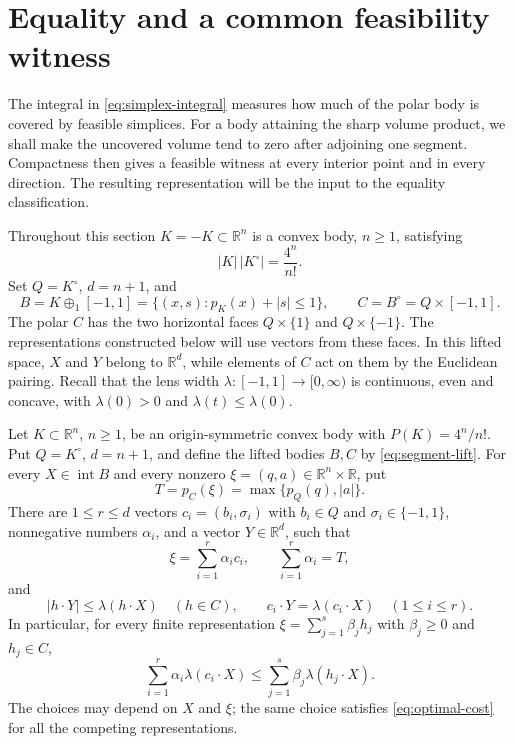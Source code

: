 \section{Equality and a common feasibility witness}
\label{sec:zero-deficit}

The integral in \eqref{eq:simplex-integral} measures how much of the
polar body is covered by feasible simplices. For a body attaining the
sharp volume product, we shall make the uncovered volume tend to zero
after adjoining one segment. Compactness then gives a feasible witness
at every interior point and in every direction. The resulting
representation will be the input to the equality classification.

Throughout this section $K=-K\subset\mathbb R^n$ is a convex body,
$n\ge1$, satisfying
\[
 |K|\,|K^\circ|=\frac{4^n}{n!}.
\]
Set $Q=K^\circ$, $d=n+1$, and
\begin{equation}\label{eq:segment-lift}
 B=K\oplus_1[-1,1]
   =\{(x,s):p_K(x)+|s|\le1\},
 \qquad C=B^\circ=Q\times[-1,1].
\end{equation}
The polar $C$ has the two horizontal faces $Q\times\{1\}$ and
$Q\times\{-1\}$. The representations constructed below will use
vectors from these faces.
In this lifted space, $X$ and $Y$ belong to $\mathbb R^d$, while elements of $C$
act on them by the Euclidean pairing. Recall that the lens width
$\lambda:[-1,1]\to[0,\infty)$ is continuous, even and concave, with
$\lambda(0)>0$ and $\lambda(t)\le\lambda(0)$.

\begin{proposition}
\label{prop:optimal-representation}
Let $K\subset\mathbb R^n$, $n\ge1$, be an origin-symmetric convex body
with $P(K)=4^n/n!$. Put $Q=K^\circ$, $d=n+1$, and define the lifted
bodies $B,C$ by \eqref{eq:segment-lift}.
For every $X\in\operatorname{int}B$ and every nonzero
$\xi=(q,a)\in\mathbb R^n\times\mathbb R$, put
\[
 T=p_C(\xi)=\max\{p_Q(q),|a|\}.
\]
There are $1\le r\le d$ vectors $c_i=(b_i,\sigma_i)$ with
$b_i\in Q$ and $\sigma_i\in\{-1,1\}$, nonnegative numbers
$\alpha_i$, and a vector $Y\in\mathbb R^d$, such that
\begin{equation}\label{eq:optimal-representation}
 \xi=\sum_{i=1}^r\alpha_i c_i,
 \qquad \sum_{i=1}^r\alpha_i=T,
\end{equation}
and
\begin{equation}\label{eq:common-witness}
 |h\cdot Y|\le\lambda(h\cdot X)\quad(h\in C),
 \qquad
 c_i\cdot Y=\lambda(c_i\cdot X)\quad(1\le i\le r).
\end{equation}
In particular, for every finite representation
$\xi=\sum_{j=1}^s\beta_jh_j$ with $\beta_j\ge0$ and $h_j\in C$,
\begin{equation}\label{eq:optimal-cost}
 \sum_{i=1}^r\alpha_i\lambda(c_i\cdot X)
 \le \sum_{j=1}^s\beta_j\lambda(h_j\cdot X).
\end{equation}
The choices may depend on $X$ and $\xi$; the same choice satisfies
\eqref{eq:optimal-cost} for all the competing representations.
\end{proposition}

